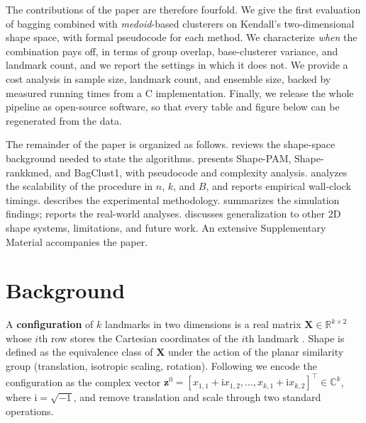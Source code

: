 \documentclass[review,11pt,3p,authoryear]{elsarticle}
\newcommand{\R}{\mathbb{R}}
\newcommand{\C}{\mathbb{C}}
\newcommand{\bz}{\mathbf{z}}
\newcommand{\bX}{\mathbf{X}}
\begin{document}
The contributions of the paper are therefore fourfold. We give the first
evaluation of bagging combined with \emph{medoid}-based clusterers on Kendall's
two-dimensional shape space, with formal pseudocode for each method. We
characterize \emph{when} the combination pays off, in terms of group overlap,
base-clusterer variance, and landmark count, and we report the settings in
which it does not. We provide a cost analysis in sample size, landmark count,
and ensemble size, backed by measured running times from a
C\raisebox{0.3ex}{\scriptsize++} implementation. Finally, we release the whole
pipeline as open-source software, so that every table and figure below can be
regenerated from the data.

The remainder of the paper is organized as follows.
 reviews the shape-space background needed to state
the algorithms.  presents Shape-PAM, Shape-rankkmed,
and BagClust1, with pseudocode and complexity analysis.
 analyzes the scalability of the procedure in $n$,
$k$, and $B$, and reports empirical wall-clock timings.
 describes the experimental methodology.
 summarizes the simulation findings;
 reports the real-world analyses.
 discusses generalization to other 2D shape systems,
limitations, and future work. An extensive Supplementary Material
accompanies the paper.


\section{Background}
\label{sec:background}

A \textbf{configuration} of $k$ landmarks in two dimensions is a real
matrix $\bX\in\R^{k\times 2}$ whose $i$th row stores the Cartesian
coordinates of the $i$th landmark \citep{dryden2016statistical}. Shape
is defined as the equivalence class of $\bX$ under the action of the
planar similarity group (translation, isotropic scaling, rotation).
Following \citet{kendall1984shape} we encode the configuration as the
complex vector $\bz^0 = [x_{1,1}+\mathrm{i}x_{1,2},\ldots,
x_{k,1}+\mathrm{i}x_{k,2}]^\top \in \C^k$, where $\mathrm{i}=\sqrt{-1}$,
and remove translation and scale through two standard operations.
\end{document}
